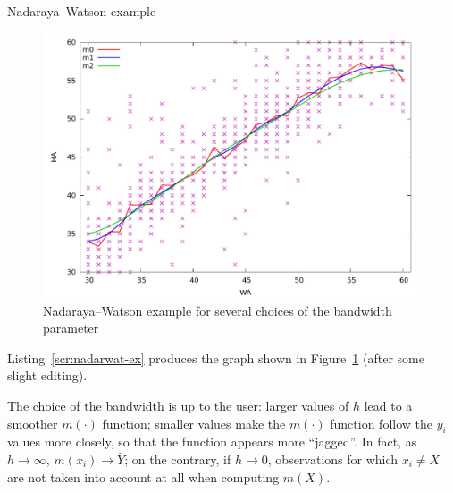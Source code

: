 \begin{script}[htbp]
  \caption{Nadaraya--Watson example}
  \label{scr:nadarwat-ex}
\end{script}

\begin{figure}[htbp]
  \centering
  \includegraphics[scale=0.5]{figures/nadarwat-ex}
  \caption{Nadaraya--Watson example for several choices of the bandwidth parameter}
  \label{fig:nadarwat-ex}
\end{figure}

Listing~\ref{scr:nadarwat-ex} produces the graph shown in
Figure~\ref{fig:nadarwat-ex} (after some slight editing).

The choice of the bandwidth is up to the user: larger values of $h$
lead to a smoother $m(\cdot)$ function; smaller values make the
$m(\cdot)$ function follow the $y_i$ values more closely, so that the
function appears more ``jagged''. In fact, as $h \to \infty$, $m(x_i)
\to \bar{Y}$; on the contrary, if $h $, observations for which
$x_i \ne X$ are not taken into account at all when computing $m(X)$.

